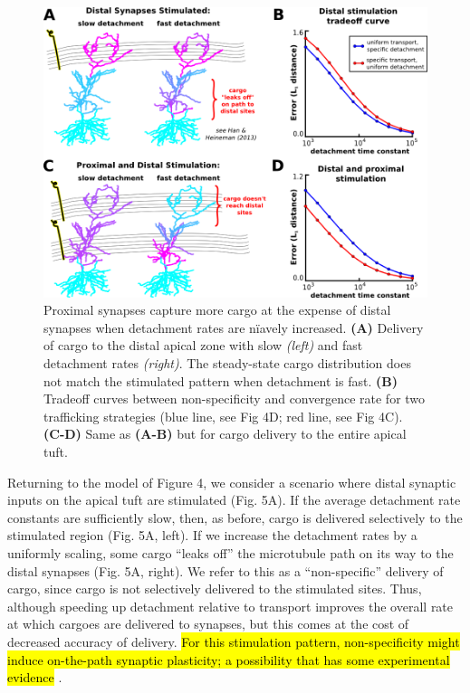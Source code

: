 \documentclass[11pt]{wlpeerj}
\begin{document}
\begin{figure}[!tb]
\begin{center}
\includegraphics[width=0.9\columnwidth]{05_heterosynaptic_ca1.png}
\caption{Proximal synapses capture more cargo at the expense of distal synapses when detachment rates are n\"iavely increased.
\textbf{(A)} Delivery of cargo to the distal apical zone with slow \textit{(left)} and fast detachment rates \textit{(right)}. The steady-state cargo distribution does not match the stimulated pattern when detachment is fast. \textbf{(B)} Tradeoff curves between non-specificity and convergence rate for two trafficking strategies (blue line, see Fig 4D; red line, see Fig 4C). \textbf{(C-D)} Same as \textbf{(A-B)} but for cargo delivery to the entire apical tuft.
}
\end{center}
\end{figure}

Returning to the model of Figure 4, we consider a scenario where distal synaptic inputs on the apical tuft are stimulated (Fig. 5A).
If the average detachment rate constants are sufficiently slow, then, as before, cargo is delivered selectively to the stimulated region (Fig. 5A, left).
If we increase the detachment rates by a uniformly scaling, some cargo ``leaks off'' the microtubule path on its way to the distal synapses (Fig. 5A, right).
We refer to this as a ``non-specific'' delivery of cargo, since cargo is not selectively delivered to the stimulated sites. Thus, although speeding up detachment relative to transport improves the overall rate at which cargoes are delivered to synapses, but this comes at the cost of decreased accuracy of delivery.
\hl{For this stimulation pattern, non-specificity might induce on-the-path synaptic plasticity; a possibility that has some experimental evidence} \citep{Han_2013}.
\end{document}
